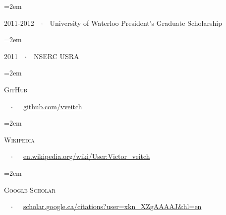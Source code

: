 \documentclass{scrartcl}
\newcommand{\MarginText}[1]{\marginpar{\raggedleft\itshape\small#1}} %
\newcommand{\Description}[1]{\hangindent=2em\hangafter=0\noindent\raggedright\footnotesize{#1}\par\normalsize\vspace{1em}} %
\begin{document}
\begin{cv}{}
\Description{2011-2012\ \ $\cdotp$\ \ University of Waterloo President's Graduate Scholarship}

\vspace{-0.5em} %

\Description{2011\ \ $\cdotp$\ \ NSERC USRA}


\vspace{1em}

\newlength{\langbox} %
\settowidth{\langbox}{google scholar} %

\Description{\MarginText{Web}\parbox{\langbox}{\textsc{GitHub}}\ \ $\cdotp$\ \ \ \href{https://github.com/vveitch}{github.com/vveitch}}
\Description{\parbox{\langbox}{\textsc{Wikipedia}}\ \ $\cdotp$\ \ \ \href{https://en.wikipedia.org/wiki/User:Victor_veitch}{en.wikipedia.org/wiki/User:Victor\_veitch}}
\Description{\parbox{\langbox}{\textsc{Google Scholar}}\ \ $\cdotp$\ \ \ \href{https://scholar.google.ca/citations?user=xkn_XZgAAAAJ&hl=en}{scholar.google.ca/citations?user=xkn\_XZgAAAAJ\&hl=en}}

\end{cv}
\end{document}

